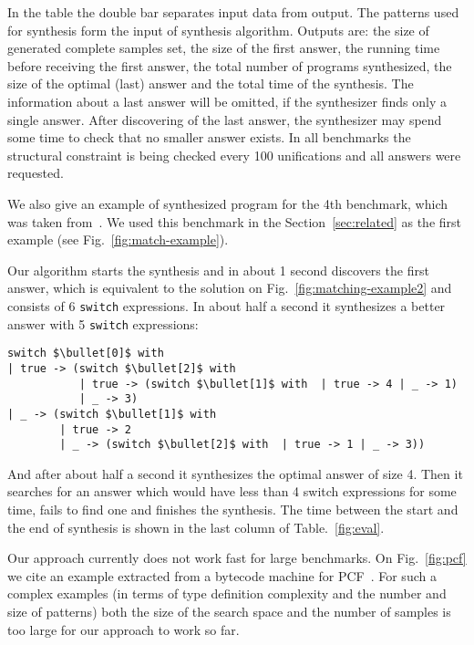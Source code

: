 In the table the double bar separates input data from output. %
The patterns used for synthesis form the input of synthesis algorithm.
Outputs are: the size of generated complete samples set, the size of the first answer, the running time before receiving the
first answer, the total number of programs synthesized, the size of the optimal (last) answer and the total time of the synthesis. The information about a last answer will be omitted, if the synthesizer finds only a single answer. After discovering of the last answer, the synthesizer may spend some time to check that no smaller answer exists.
In all benchmarks the structural constraint is being checked every 100 unifications and all answers were requested.

We also give an example of synthesized program for the 4th benchmark, which was taken from~\cite{maranget2008}. We used this benchmark in the Section~\ref{sec:related} as the first example (see Fig.~\ref{fig:match-example}).

Our algorithm starts the
synthesis and in about 1 second discovers the first answer, which is equivalent to the solution on Fig.~\ref{fig:matching-example2} and
consists of 6 \lstinline|switch| expressions. In about half a second it synthesizes a better answer with 5 \lstinline|switch| expressions:

\begin{lstlisting}
switch $\bullet[0]$ with
| true -> (switch $\bullet[2]$ with  
           | true -> (switch $\bullet[1]$ with  | true -> 4 | _ -> 1)
           | _ -> 3)
| _ -> (switch $\bullet[1]$ with  
        | true -> 2
        | _ -> (switch $\bullet[2]$ with  | true -> 1 | _ -> 3))
\end{lstlisting}

And after about half a second it synthesizes the optimal answer of size 4. Then it searches for an answer which would have less than 4 switch expressions
for some time, fails to find one and finishes the synthesis. 
The time between the start and the end of synthesis is shown in the last column of Table.~\ref{fig:eval}.

Our approach currently does not work fast for large benchmarks. On Fig.~\ref{fig:pcf} we cite an example extracted from a bytecode
machine for PCF~\cite{maranget2008,Plotkin1977LCFCA}. For such a complex examples (in terms of type definition complexity and the number and size of patterns)
both the size of the search space and the number of samples is too large for our approach to work so far.

